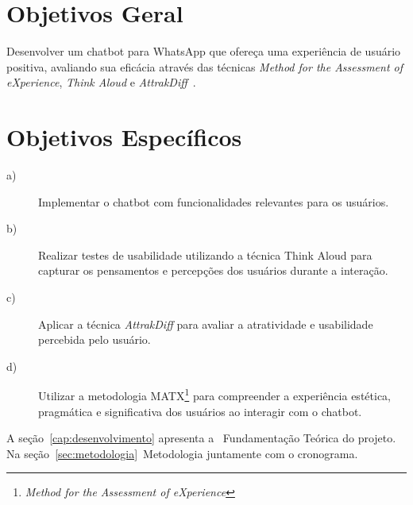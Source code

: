 
\section{Objetivos Geral}

Desenvolver um chatbot para WhatsApp que ofereça uma experiência de usuário positiva, avaliando sua eficácia através das técnicas \textit{Method for the Assessment of eXperience}, \textit{Think Aloud} e \textit{AttrakDiff}~\cite{Barbosa2022,Folstad2019,Weizenbaum_1966,Valentim2014}.

\section{Objetivos Específicos}

\begin{description}
	\item[a)] Implementar o chatbot com funcionalidades relevantes para os usuários.
	\item[b)] Realizar testes de usabilidade utilizando a técnica Think Aloud para capturar os pensamentos e percepções dos usuários durante a interação.
	\item[c)] Aplicar a técnica \textit{AttrakDiff} para avaliar a atratividade e usabilidade percebida pelo usuário.
	\item[d)] Utilizar a metodologia MATX\footnote{\textit{Method for the Assessment of eXperience}} para compreender a experiência estética, pragmática e significativa dos usuários ao interagir com o chatbot.
\end{description}

A seção~\ref{cap:desenvolvimento} apresenta a ~Fundamentação Teórica do projeto. Na seção~\ref{sec:metodologia}~Metodologia juntamente com o cronograma.
